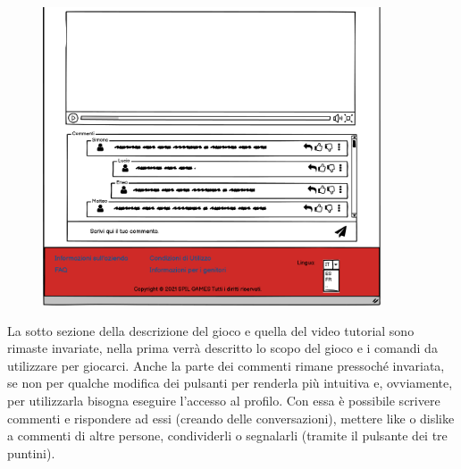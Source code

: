 \documentclass[../Report.tex]{subfiles}
\begin{document}
    \begin{figure}[H]
        \includegraphics[width=10cm]{WGioco_2.png}
        \centering
    \end{figure}

    La sotto sezione della descrizione del gioco e quella del video tutorial sono rimaste invariate, nella prima verrà descritto lo scopo del gioco e i comandi da utilizzare per giocarci. Anche la parte dei commenti rimane pressoché invariata, se non per qualche modifica dei pulsanti per renderla più intuitiva e, ovviamente, per utilizzarla bisogna eseguire l'accesso al profilo. Con essa è possibile scrivere commenti e rispondere ad essi (creando delle conversazioni), mettere like o dislike a commenti di altre persone, condividerli o segnalarli (tramite il pulsante dei tre puntini).
\end{document}
